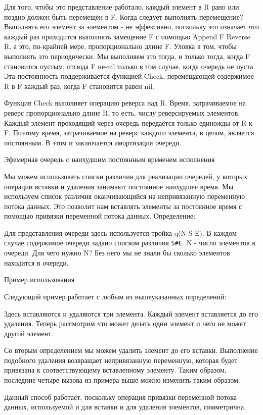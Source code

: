 Для того, чтобы это представление работало, каждый элемент в R рано или поздно должен быть перемещён в F. Когда следует выполнять перемещение? Выполнять его элемент за элементом - не эффективно, поскольку это означает что каждый раз приходится выполнять замещение F с помощью {Append F {Reverse R}}, а это, по-крайней мере, пропорционально длине F. Уловка в том, чтобы выполнять это периодически. Мы выполняем это тогда, и только тогда, когда F становится пустым, отсюда F не-nil только в том случае, когда очередь не пуста. Эта постоянность поддерживается функцией Check, перемещающей содержимое R в F каждый раз, когда F становится равен nil.

Функция Check выполняет операцию реверса над R. Время, затрачиваемое на реверс пропорционально длине R, то есть, числу реверсируемых элементов. Каждый элемент проходящий через очередь передаётся только единожды от R к F. Поэтому время, затрачиваемое на реверс каждого элемента, в целом, является постоянным. В этом и заключается амортизация очереди.

Эфемерная очередь с наихудшим постоянным временем исполнения

Мы можем использовать списки различия для реализации очередей, у которых операции вставки и удаления занимают постоянное наихудшее время. Мы используем список различия оканчивающийся на непривязанную переменную потока данных. Это позволит нам вставлять элементы за постоянное время с помощью привязки переменной потока данных. Определение:

Для представления очереди здесь используется тройка q(N S E). В каждом случае содержимое очереди задано списком различия \verb!S#E!. N - число элементов в очереди. Для чего нужно N? Без него мы не знали бы сколько элементов находится в очереди.

Пример использования

Следующий пример работает с любым из вышеуказанных определений:

Здесь вставляются и удаляются три элемента. Каждый элемент вставляется до его удаления. Теперь рассмотрим что может делать один элемент и чего не может другой элемент.

Со вторым определением мы можем удалить элемент до его вставки. Выполнение подобного удаления возвращает непривязанную переменную, которая будет привязана к соответствующему вставленному элементу. Таким образом, последние четыре вызова из примера выше можно изменить таким образом:

Данный способ работает, поскольку операция привязки переменной потока данных, используемой и для вставки и для удаления элементов, симметрична.

